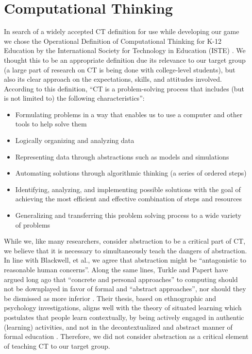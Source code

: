 \documentclass{acm_proc_article-sp}
\begin{document}
\section{Computational Thinking}
\label{sec:computational_thinking}
In search of a widely accepted CT definition for use while developing our game we chose the Operational Definition of Computational Thinking for K-12 Education by the International Society for Technology in Education (ISTE) \cite{operationalct}. 
We thought this to be an appropriate definition due its relevance to our target group (a large part of research on CT is being done with college-level students), but also its clear approach on the expectations, skills, and attitudes involved. 
According to this definition, ``CT is a problem-solving process that includes (but is not limited to) the following characteristics'': 
\begin{itemize}
  \item{Formulating problems in a way that enables us to use a computer and other tools to help solve them}
  \item{Logically organizing and analyzing data}
  \item{Representing data through abstractions such as models and simulations}
  \item{Automating solutions through algorithmic thinking (a series of ordered steps)}
  \item{Identifying, analyzing, and implementing possible solutions with the goal of achieving the most efficient and effective combination of steps and resources}
  \item{Generalizing and transferring this problem solving process to a wide variety of problems}
\end{itemize}
While we, like many researchers, consider abstraction to be a critical part of CT, we believe that it is necessary to simultaneously teach the dangers of abstraction. 
In line with Blackwell, et al., we agree that abstraction might be ``antagonistic to reasonable human concerns''\cite{blackwell2008abstract}. 
Along the same lines, Turkle and Papert have argued long ago that ``concrete and personal approaches'' to computing should not be downplayed in favor of formal and ``abstract approaches'', nor should they be dismissed as more inferior \cite{turkle1990epistemological}. 
Their thesis, based on ethnographic and psychology investigations, aligns well with the theory of situated learning which postulates that people learn contextually, by being actively engaged in authentic (learning) activities, and not in the decontextualized and abstract manner of formal education \cite{brown1989situated}. 
Therefore, we did not consider abstraction as a critical element of teaching CT to our target group.
\end{document}
